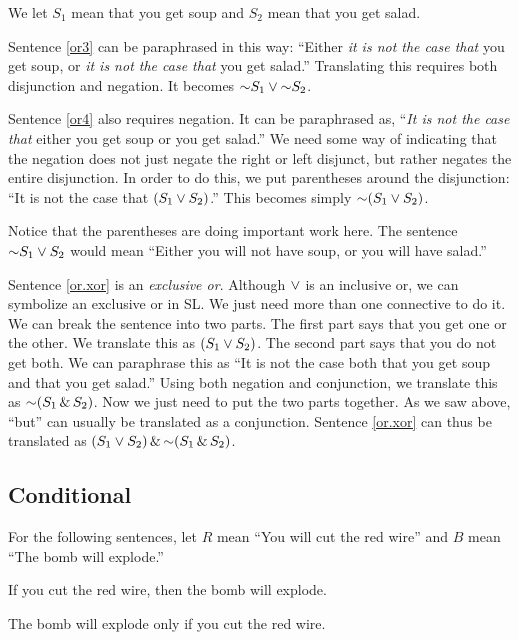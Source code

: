 We let $S_1$ mean that you get soup and $S_2$ mean that you get salad.

Sentence \ref{or3} can be paraphrased in this way: ``Either \emph{it is not the case that} you get soup, or \emph{it is not the case that} you get salad.'' Translating this requires both disjunction and negation. It becomes $\mathord{\sim} S_1 \vee \mathord{\sim} S_2$.

Sentence \ref{or4} also requires negation. It can be paraphrased as, ``\emph{It is not the case that} either you get soup or you get salad.'' We need some way of indicating that the negation does not just negate the right or left disjunct, but rather negates the entire disjunction. In order to do this, we put parentheses around the disjunction: ``It is not the case that $(S_1 \vee S_2)$.'' This becomes simply $\mathord{\sim} (S_1 \vee S_2)$.

Notice that the parentheses are doing important work here. The sentence $\mathord{\sim} S_1 \vee S_2$ would mean ``Either you will not have soup, or you will have salad.''

Sentence \ref{or.xor} is an \emph{exclusive or}. Although $\vee$ is an inclusive or, we can symbolize an exclusive or in {SL}. We just need more than one connective to do it. We can break the sentence into two parts. The first part says that you get one or the other. We translate this as $(S_1 \vee S_2)$. The second part says that you do not get both. We can paraphrase this as ``It is not the case both that you get soup and that you get salad.'' Using both negation and conjunction, we translate this as $\mathord{\sim}(S_1 \,\&\, S_2)$. Now we just need to put the two parts together. As we saw above, ``but'' can usually be translated as a conjunction. Sentence \ref{or.xor} can thus be translated as $(S_1 \vee S_2) \,\&\, \mathord{\sim}(S_1 \,\&\, S_2)$.


\subsection{Conditional}
For the following sentences, let $R$ mean ``You will cut the red wire'' and $B$ mean ``The bomb will explode.''

\begin{earg}
\item[\ex{if1}] If you cut the red wire, then the bomb will explode.
\item[\ex{if2}] The bomb will explode only if you cut the red wire.
\end{earg}

